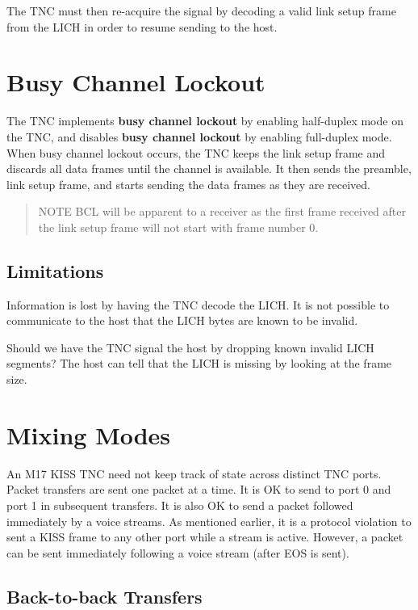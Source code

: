 \documentclass[a4paper,11pt]{book}
\begin{document}
The TNC must then re-acquire the signal by decoding a valid link setup frame from the LICH in order to resume sending to the host.

\section{Busy Channel Lockout}

The TNC implements \textbf{busy channel lockout} by enabling half-duplex mode on the TNC, and disables \textbf{busy channel lockout} by enabling full-duplex mode. When busy channel lockout occurs, the TNC keeps the link setup frame and discards all data frames until the channel is available. It then sends the preamble, link setup frame, and starts sending the data frames as they are received.

\begin{quote}
	NOTE BCL will be apparent to a receiver as the first frame received after the link setup frame will not start with frame number 0.
\end{quote}

\subsection{Limitations}

Information is lost by having the TNC decode the LICH. It is not possible to communicate to the host that the LICH bytes are known to be invalid.

Should we have the TNC signal the host by dropping known invalid LICH segments? The host can tell that the LICH is missing by looking at the frame size.

\section{Mixing Modes}

An M17 KISS TNC need not keep track of state across distinct TNC ports. Packet transfers are sent one packet at a time. It is OK to send to port 0 and port 1 in subsequent transfers. It is also OK to send a packet followed immediately by a voice streams. As mentioned earlier, it is a protocol violation to sent a KISS frame to any other port while a stream is active. However, a packet can be sent immediately following a voice stream (after EOS is sent).

\subsection{Back-to-back Transfers}
\end{document}

